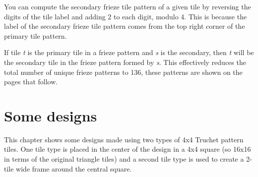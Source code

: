\documentclass{tufte-book}
\begin{document}
\vspace{0.5cm}
\noindent
You can compute the secondary frieze tile pattern of a given tile by reversing the digits of the tile label and adding 2 to each digit, modulo 4. This is because the label of the secondary frieze tile pattern comes from the top right corner of the primary tile pattern. 

\vspace{0.5cm}
\noindent
If tile \textit{t} is the primary tile in a frieze pattern and \textit{s} is the secondary, then \textit{t} will be the secondary tile in the frieze pattern formed by \textit{s}. This effectively reduces the total number of unique frieze patterns to 136, these patterns are shown on the pages that follow.
\newpage



\chapter{Some designs}
This chapter shows some designs made using two types of 4x4 Truchet pattern tiles. One tile type is placed in the center of the design in a 4x4 square (so 16x16 in terms of the original triangle tiles) and a second tile type is used to create a 2-tile wide frame around the central square.

{
\setlength{\tabcolsep}{0pt}
\renewcommand{\arraystretch}{0}

}

\backmatter
\nocite{*}


\end{document}
